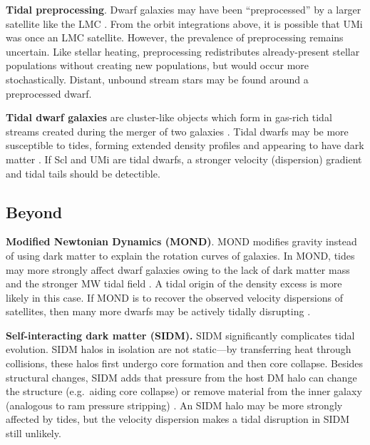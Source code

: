 \textbf{Tidal preprocessing}. Dwarf galaxies may have been
``preprocessed'' by a larger satellite like the LMC
\citep[e.g.,][]{santistevan+2023, riley+2024}. From the orbit
integrations above, it is possible that UMi was once an LMC satellite.
However, the prevalence of preprocessing remains uncertain. Like stellar
heating, preprocessing redistributes already-present stellar populations
without creating new populations, but would occur more stochastically.
Distant, unbound stream stars may be found around a preprocessed dwarf.

\textbf{Tidal dwarf galaxies} are cluster-like objects which form in
gas-rich tidal streams created during the merger of two galaxies
\citep[e.g.,][]{mirabel+dottori+lutz1992, bournaud+duc2006}. Tidal
dwarfs may be more susceptible to tides, forming extended density
profiles and appearing to have dark matter
\citep{casas+2012, yang+2014, wang+2024a}. If Scl and UMi are tidal
dwarfs, a stronger velocity (dispersion) gradient and tidal tails should
be detectible.

\subsection{\texorpdfstring{Beyond \LCDM{}}{Beyond }}\label{beyond}

\textbf{Modified Newtonian Dynamics (MOND)}. MOND modifies gravity
instead of using dark matter to explain the rotation curves of galaxies.
In MOND, tides may more strongly affect dwarf galaxies owing to the lack
of dark matter mass and the stronger MW tidal field
\citep{mcgaugh+wolf2010, brada+milgrom2000}. A tidal origin of the
density excess is more likely in this case. If MOND is to recover the
observed velocity dispersions of satellites, then many more dwarfs may
be actively tidally disrupting
\citetext{\citealp{mcgaugh+wolf2010}; \citealp[but see
also][]{sanchez-salcedo+hernandez2007}}.

\textbf{Self-interacting dark matter (SIDM).} SIDM significantly
complicates tidal evolution. SIDM halos in isolation are not static---by
transferring heat through collisions, these halos first undergo core
formation and then core collapse. Besides structural changes, SIDM adds
that pressure from the host DM halo can change the structure
(e.g.~aiding core collapse) or remove material from the inner galaxy
(analogous to ram pressure stripping) \citep[e.g.,][]{cartonzeng+2024}.
An SIDM halo may be more strongly affected by tides, but the velocity
dispersion makes a tidal disruption in SIDM still unlikely.

